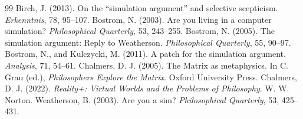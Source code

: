 \documentclass{situationist-preprint}
\begin{document}
\begin{thebibliography}{99}\small
{} Birch, J. (2013). On the \enquote{simulation argument} and selective scepticism. \emph{Erkenntnis}, 78, 95--107.
 Bostrom, N. (2003). Are you living in a computer simulation? \emph{Philosophical Quarterly}, 53, 243--255.
 Bostrom, N. (2005). The simulation argument: Reply to Weatherson. \emph{Philosophical Quarterly}, 55, 90--97.
 Bostrom, N., and Kulczycki, M. (2011). A patch for the simulation argument. \emph{Analysis}, 71, 54--61.
 Chalmers, D. J. (2005). The Matrix as metaphysics. In C. Grau (ed.), \emph{Philosophers Explore the Matrix}. Oxford University Press.
 Chalmers, D. J. (2022). \emph{Reality+: Virtual Worlds and the Problems of Philosophy}. W. W. Norton.
 Weatherson, B. (2003). Are you a sim? \emph{Philosophical Quarterly}, 53, 425--431.
\end{thebibliography}
\end{document}
